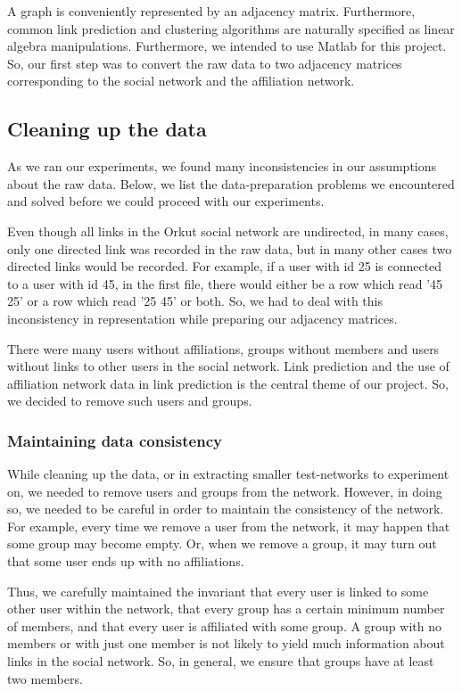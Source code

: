 \documentclass{report}
\begin{document}
A graph is conveniently represented by an adjacency matrix. Furthermore, common link prediction and clustering algorithms are naturally specified as linear algebra manipulations. Furthermore, we intended to use Matlab for this project. So, our first step was to convert the raw data to two adjacency matrices corresponding to the social network and the affiliation network.

\subsection{Cleaning up the data}
As we ran our experiments, we found many inconsistencies in our assumptions about the raw data. Below, we list the data-preparation problems we encountered and solved before we could proceed with our experiments.

Even though all links in the Orkut social network are undirected, in many cases, only one directed link was recorded in the raw data, but in many other cases two directed links would be recorded. For example, if a user with id 25 is connected to a user with id 45, in the first file, there would either be a row which read '45 25' or a row which read '25 45' or both. So, we had to deal with this inconsistency in representation while preparing our adjacency matrices.

There were many users without affiliations, groups without members and users without links to other users in the social network. Link prediction and the use of affiliation network data in link prediction is the central theme of our project. So, we decided to remove such users and groups.

\subsubsection{Maintaining data consistency}
While cleaning up the data, or in extracting smaller test-networks to experiment on, we needed to remove users and groups from the network. However, in doing so, we needed to be careful in order to maintain the consistency of the network. For example, every time we remove a user from the network, it may happen that some group may become empty. Or, when we remove a group, it may turn out that some user ends up with no affiliations.

Thus, we carefully maintained the invariant that every user is linked to some other user within the network, that every group has a certain minimum number of members, and that every user is affiliated with some group. A group with no members or with just one member is not likely to yield much information about links in the social network. So, in general, we ensure that groups have at least two members.
\end{document}
